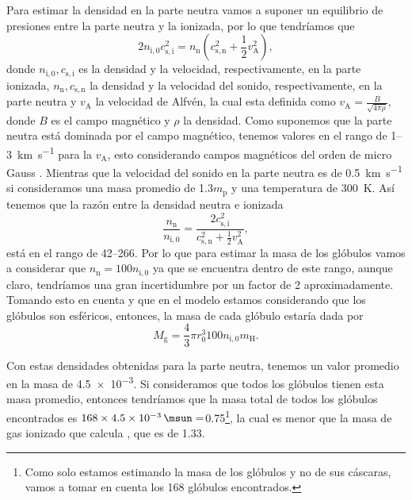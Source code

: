 \documentclass{book}
\begin{document}
Para estimar la densidad en la parte neutra vamos a suponer un
equilibrio de presiones entre la parte neutra y la ionizada, por lo
que tendríamos que
\begin{equation}
    2 n_\mathrm{i,0}c_\mathrm{s,i}^2 = n_\mathrm{n}(c_\mathrm{s,n}^2+\frac{1}{2}v_\mathrm{A}^2),
\end{equation}
donde $n_\mathrm{i,0}, c_\mathrm{s,i}$ es la densidad y la velocidad,
respectivamente, en la parte ionizada, $n_\mathrm{n}, c_\mathrm{s,n}$
la densidad y la velocidad del sonido, respectivamente, en la parte
neutra y $v_\mathrm{A}$ la velocidad de Alfvén, la cual esta definida
como $v_\mathrm{A}=\frac{B}{\sqrt{4\pi \rho}}$, donde $B$ es el campo
magnético y $\rho$ la densidad. Como suponemos que la parte neutra está
dominada por el campo magnético, tenemos valores en el rango de
1--\SI{3}{km.s^{-1}} para la $v_\mathrm{A}$, esto considerando campos
magnéticos del orden de micro Gauss \citep{Bertoldi_1989}. Mientras
que la velocidad del sonido en la parte neutra es de
\SI{0.5}{km.s^{-1}} si consideramos una masa promedio de
1.3$m_\mathrm{p}$ y una temperatura de \SI{300}{K}. Así tenemos que la
razón entre la densidad neutra e ionizada
\begin{equation}
    \frac{n_\mathrm{n}}{n_\mathrm{i,0}}=\frac{2c_\mathrm{s,i}^2}{c_\mathrm{s,n}^2+\frac{1}{2}v_\mathrm{A}^2},
\end{equation}
está en el rango de 42--266. Por lo que para estimar la masa de los
glóbulos vamos a considerar que $n_\mathrm{n}=100n_\mathrm{i,0}$ ya
que se encuentra dentro de este rango, aunque claro, tendríamos una
gran incertidumbre por un factor de 2 aproximadamente. Tomando esto en
cuenta y que en el modelo estamos considerando que los glóbulos son
esféricos, entonces, la masa de cada glóbulo estaría dada por
\begin{equation}
    M_\mathrm{g} = \frac{4}{3}\pi r_0^3 100n_\mathrm{i,0} m_\mathrm{H}.
\end{equation}

Con estas densidades obtenidas para la parte neutra, tenemos un valor
promedio en la masa de \SI{4.5e-3}{\msun}. Si consideramos que todos
los glóbulos tienen esta masa promedio, entonces tendríamos que la
masa total de todos los glóbulos encontrados es
$168\times\SI{4.5e-3}{\msun}=$\SI{0.75}{\msun}\footnote{Como solo estamos
  estimando la masa de los glóbulos y no de sus cáscaras, vamos a
  tomar en cuenta los 168 glóbulos encontrados. }, la cual es menor
que la masa de gas ionizado que calcula \cite{Grosdidier:1998}, que es
de \SI{1.33}{\msun}.
\end{document}
